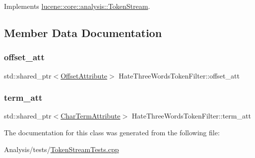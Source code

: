 Implements \mbox{\hyperlink{classlucene_1_1core_1_1analysis_1_1TokenStream_a614d4ea24a354d6f4354b4941b5124e2}{lucene\+::core\+::analysis\+::\+Token\+Stream}}.



\subsection{Member Data Documentation}
\mbox{\label{classHateThreeWordsTokenFilter_ab4f8e5cab969bbd844cff5ce59e78025}} 
\subsubsection{\texorpdfstring{offset\+\_\+att}{offset\_att}}
{\footnotesize\ttfamily std\+::shared\+\_\+ptr$<$\mbox{\hyperlink{classlucene_1_1core_1_1analysis_1_1tokenattributes_1_1OffsetAttribute}{Offset\+Attribute}}$>$ Hate\+Three\+Words\+Token\+Filter\+::offset\+\_\+att}

\mbox{\label{classHateThreeWordsTokenFilter_a1474587e08f5c86b42c24badf44d7336}} 
\subsubsection{\texorpdfstring{term\+\_\+att}{term\_att}}
{\footnotesize\ttfamily std\+::shared\+\_\+ptr$<$\mbox{\hyperlink{classlucene_1_1core_1_1analysis_1_1tokenattributes_1_1CharTermAttribute}{Char\+Term\+Attribute}}$>$ Hate\+Three\+Words\+Token\+Filter\+::term\+\_\+att}



The documentation for this class was generated from the following file\+:\begin{DoxyCompactItemize}
\item 
Analysis/tests/\mbox{\hyperlink{TokenStreamTests_8cpp}{Token\+Stream\+Tests.\+cpp}}\end{DoxyCompactItemize}
